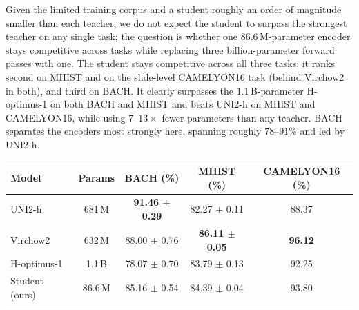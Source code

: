 \documentclass[10pt]{article}
\begin{document}
Given the limited training corpus and a student roughly an order of magnitude smaller than each
teacher, we do not expect the student to surpass the strongest teacher on any single task; the
question is whether one $86.6$\,M-parameter encoder stays competitive across tasks while replacing
three billion-parameter forward passes with one. The student stays competitive across all three
tasks: it ranks second on MHIST and on the slide-level CAMELYON16 task (behind Virchow2 in both),
and third on BACH. It clearly surpasses the $1.1$\,B-parameter H-optimus-1 on both BACH and MHIST
and beats UNI2-h on MHIST and CAMELYON16, while using $7$--$13\times$ fewer parameters than any
teacher. BACH separates the encoders most strongly here, spanning roughly $78$--$91\%$ and led by
UNI2-h.

\begin{center}
\begin{tabular}{lcccc}
\toprule
Model & Params & BACH (\%) & MHIST (\%) & CAMELYON16 (\%) \\
\midrule
UNI2-h~\cite{uni}        & 681\,M & \textbf{91.46 $\pm$ 0.29} & 82.27 $\pm$ 0.11 & 88.37 \\
Virchow2~\cite{virchow2} & 632\,M & 88.00 $\pm$ 0.76 & \textbf{86.11 $\pm$ 0.05} & \textbf{96.12} \\
H-optimus-1~\cite{hoptimus} & 1.1\,B & 78.07 $\pm$ 0.70 & 83.79 $\pm$ 0.13 & 92.25 \\
\midrule
Student (ours)           & 86.6\,M & 85.16 $\pm$ 0.54 & 84.39 $\pm$ 0.04 & 93.80 \\
\bottomrule
\end{tabular}
\end{center}
\end{document}
